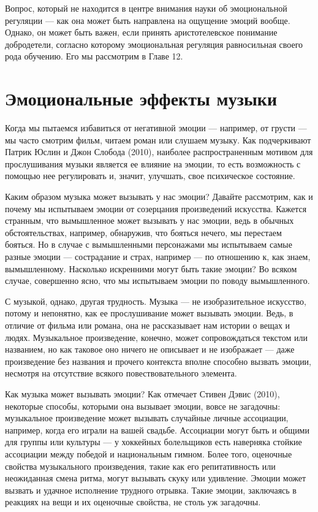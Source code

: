 \documentclass[11pt]{book}
\begin{document}
Вопрос, который не находится в центре внимания науки об эмоциональной регуляции --- как она может быть направлена на ощущение эмоций вообще. Однако, он может быть важен, если принять аристотелевское понимание добродетели, согласно которому эмоциональная регуляция равносильная своего рода обучению. Его мы рассмотрим в Главе 12.

\section{Эмоциональные эффекты музыки}

Когда мы пытаемся избавиться от негативной эмоции --- например, от грусти --- мы часто смотрим фильм, читаем роман или слушаем музыку. Как подчеркивают Патрик Юслин и Джон Слобода (2010), наиболее распространенным мотивом для прослушивания музыки является ее влияние на эмоции, то есть возможность с помощью нее регулировать и, значит, улучшать, свое психическое состояние.

Каким образом музыка может вызывать у нас эмоции? Давайте рассмотрим, как и почему мы испытываем эмоции от созерцания произведений искусства. Кажется странным, что вымышленное может вызывать у нас эмоции, ведь в обычных обстоятельствах, например, обнаружив, что бояться нечего, мы перестаем бояться. Но в случае с вымышленными персонажами мы испытываем самые разные эмоции --- сострадание и страх, например --- по отношению к, как знаем, вымышленному. Насколько искренними могут быть такие эмоции? Во всяком случае, совершенно ясно, что мы испытываем эмоции по поводу вымышленного.

С музыкой, однако, другая трудность. Музыка --- не изобразительное искусство, потому и непонятно, как ее прослушивание может вызывать эмоции. Ведь, в отличие от фильма или романа, она не рассказывает нам истории о вещах и людях. Музыкальное произведение, конечно, может сопровождаться текстом или названием, но как таковое оно ничего не описывает и не изображает --- даже произведение без названия и прочего контекста вполне способно вызвать эмоции, несмотря на отсутствие всякого повествовательного элемента.

Как музыка может вызывать эмоции? Как отмечает Стивен Дэвис (2010), некоторые способы, которыми она вызывает эмоции, вовсе не загадочны: музыкальное произведение может вызывать случайные личные ассоциации, например, когда его играли на вашей свадьбе. Ассоциации могут быть и общими для группы или культуры --- у хоккейных болельщиков есть наверняка стойкие ассоциации между победой и национальным гимном. Более того, оценочные свойства музыкального произведения, такие как его репитативность или неожиданная смена ритма, могут вызывать скуку или удивление. Эмоции может вызвать и удачное исполнение трудного отрывка. Такие эмоции, заключаясь в реакциях на вещи и их оценочные свойства, не столь уж загадочны.
\end{document}
